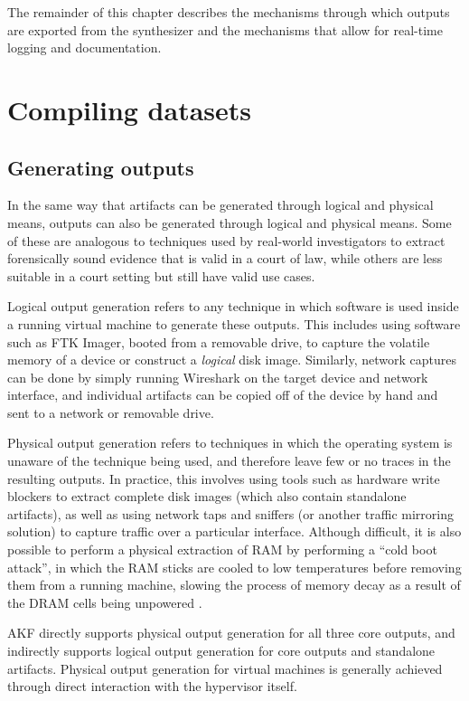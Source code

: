 \documentclass[letterpaper,12pt]{report}
\begin{document}
The remainder of this chapter describes the mechanisms through which
outputs are exported from the synthesizer and the mechanisms that allow
for real-time logging and documentation.

\section{Compiling datasets}\label{compiling-datasets}

\subsection{Generating outputs}\label{generating-outputs}

In the same way that artifacts can be generated through logical and
physical means, outputs can also be generated through logical and
physical means. Some of these are analogous to techniques used by
real-world investigators to extract forensically sound evidence that is
valid in a court of law, while others are less suitable in a court
setting but still have valid use cases.

Logical output generation refers to any technique in which software is
used inside a running virtual machine to generate these outputs. This
includes using software such as FTK Imager, booted from a removable
drive, to capture the volatile memory of a device or construct a
\emph{logical} disk image. Similarly, network captures can be done by
simply running Wireshark on the target device and network interface, and
individual artifacts can be copied off of the device by hand and sent to
a network or removable drive.

Physical output generation refers to techniques in which the operating
system is unaware of the technique being used, and therefore leave few
or no traces in the resulting outputs. In practice, this involves using
tools such as hardware write blockers to extract complete disk images
(which also contain standalone artifacts), as well as using network taps
and sniffers (or another traffic mirroring solution) to capture traffic
over a particular interface. Although difficult, it is also possible to
perform a physical extraction of RAM by performing a ``cold boot
attack'', in which the RAM sticks are cooled to low temperatures before
removing them from a running machine, slowing the process of memory
decay as a result of the DRAM cells being unpowered
\cite{yitbarekColdBootAttacks2017}.

AKF directly supports physical output generation for all three core
outputs, and indirectly supports logical output generation for core
outputs and standalone artifacts. Physical output generation for virtual
machines is generally achieved through direct interaction with the
hypervisor itself.
\end{document}
